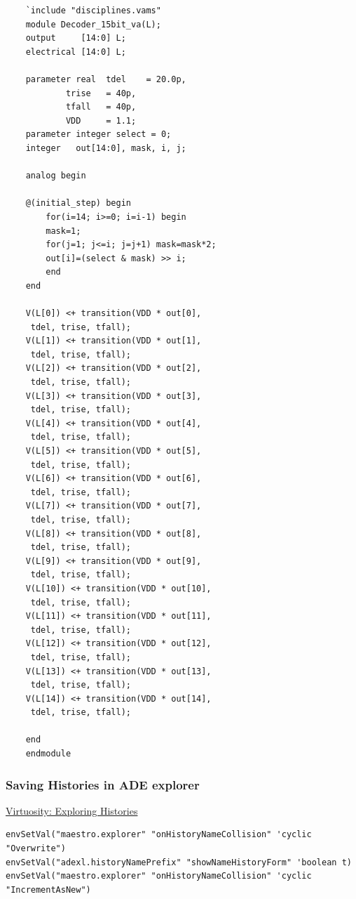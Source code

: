 \documentclass{article}
\begin{document}
\begin{file}
	\begin{lstlisting}
	`include "disciplines.vams"
	module Decoder_15bit_va(L);
	output     [14:0] L;
	electrical [14:0] L;

	parameter real 	tdel 	= 20.0p,
			trise	= 40p,
			tfall	= 40p,
			VDD 	= 1.1;
	parameter integer select = 0;
	integer   out[14:0], mask, i, j;

	analog begin
	
	@(initial_step) begin
		for(i=14; i>=0; i=i-1) begin
		mask=1;
		for(j=1; j<=i; j=j+1) mask=mask*2;
		out[i]=(select & mask) >> i;
		end
	end

	V(L[0]) <+ transition(VDD * out[0],
	 tdel, trise, tfall);
	V(L[1]) <+ transition(VDD * out[1],
	 tdel, trise, tfall);
	V(L[2]) <+ transition(VDD * out[2],
	 tdel, trise, tfall);
	V(L[3]) <+ transition(VDD * out[3],
	 tdel, trise, tfall);
	V(L[4]) <+ transition(VDD * out[4],
	 tdel, trise, tfall);
	V(L[5]) <+ transition(VDD * out[5],
	 tdel, trise, tfall);
	V(L[6]) <+ transition(VDD * out[6],
	 tdel, trise, tfall);
	V(L[7]) <+ transition(VDD * out[7],
	 tdel, trise, tfall);
	V(L[8]) <+ transition(VDD * out[8],
	 tdel, trise, tfall);
	V(L[9]) <+ transition(VDD * out[9],
	 tdel, trise, tfall);
	V(L[10]) <+ transition(VDD * out[10],
	 tdel, trise, tfall);
	V(L[11]) <+ transition(VDD * out[11],
	 tdel, trise, tfall);
	V(L[12]) <+ transition(VDD * out[12],
	 tdel, trise, tfall);
	V(L[13]) <+ transition(VDD * out[13],
	 tdel, trise, tfall);
	V(L[14]) <+ transition(VDD * out[14],
	 tdel, trise, tfall);

	end  
	endmodule
	\end{lstlisting}
\end{file}

\newpage

\subsubsection*{Saving Histories in ADE explorer}

\href{https://community.cadence.com/cadence_blogs_8/b/cic/posts/virtuosity-exploring-histories}{Virtuosity: Exploring Histories}
\begin{verbatim}
envSetVal("maestro.explorer" "onHistoryNameCollision" 'cyclic "Overwrite")
envSetVal("adexl.historyNamePrefix" "showNameHistoryForm" 'boolean t)
envSetVal("maestro.explorer" "onHistoryNameCollision" 'cyclic "IncrementAsNew")
\end{verbatim}
\end{document}
